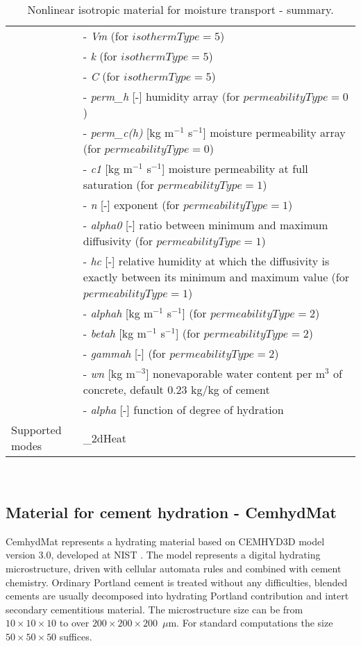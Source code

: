\documentclass[a4paper]{article}
\newcommand{\param}[1]{{\it #1}}
\newenvironment{mmt}{\begin{tabular}{|l|p{9cm}|}}{\end{tabular}\\}
\newenvironment{mmt}{\begin{tabular}{|l|l|}}{\end{tabular}\\}
\begin{document}
\begin{table}[!htb]
\begin{mmt}
&- \param{Vm} (for $isothermType=5$) \\
&- \param{k} (for $isothermType=5$) \\
&- \param{C} (for $isothermType=5$) \\
&- \param{perm\_h} [-] humidity array (for $permeabilityType=0$) \\
&- \param{perm\_c(h)} [kg m$^{-1}$ s$^{-1}$] moisture permeability
array (for $permeabilityType=0$) \\
&- \param{c1} [kg m$^{-1}$ s$^{-1}$] moisture permeability at full
saturation (for $permeabilityType=1$) \\
&- \param{n} [-] exponent (for $permeabilityType=1$) \\
&- \param{alpha0} [-] ratio between minimum and maximum diffusivity
(for $permeabilityType=1$) \\
&- \param{hc} [-] relative humidity at which the diffusivity is exactly
between its minimum and maximum value (for $permeabilityType=1$) \\
&- \param{alphah} [kg m$^{-1}$ s$^{-1}$] (for $permeabilityType=2$) \\
&- \param{betah} [kg m$^{-1}$ s$^{-1}$] (for $permeabilityType=2$) \\
&- \param{gammah} [-] (for $permeabilityType=2$) \\
&- \param{wn} [kg m$^{-3}$] nonevaporable water content per m$^3$ of concrete, default 0.23 kg/kg of cement\\
&- \param{alpha} [-] function of degree of hydration \\

Supported modes& \_2dHeat \\
\hline
\end{mmt}
\caption{Nonlinear isotropic material for moisture transport - summary.}
\label{NlIsoMoistureMat}
\end{table}



\subsection{Material for cement hydration - CemhydMat}
\label{Cemhyd}
CemhydMat represents a hydrating material based on CEMHYD3D model version 3.0,
developed at NIST \cite{NISTIR7232}. The model represents a digital hydrating
microstructure, driven with cellular automata rules and combined with cement
chemistry. Ordinary Portland cement is treated without any difficulties, blended
cements are usually decomposed into hydrating Portland contribution and intert
secondary cementitious material. The microstructure size can be from
$10\times10\times10$ to over $200\times200\times200$~$\mu$m. For standard
computations the size $50\times50\times50$ suffices.
\end{document}
